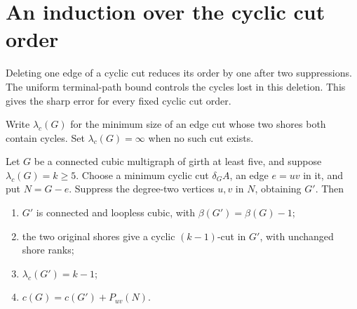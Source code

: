 \section{An induction over the cyclic cut order}
\label{sec:path-fixed-cut-induction}

Deleting one edge of a cyclic cut reduces its order by one after two suppressions.
The uniform terminal-path bound controls the cycles lost in this deletion.
This gives the sharp error for every fixed cyclic cut order.

Write $\lambda_c(G)$ for the minimum size of an edge cut whose two shores both contain cycles.
Set $\lambda_c(G)=\infty$ when no such cut exists.

\begin{lemma}
\label{lem:path-minimum-cyclic-cut-smoothing}
Let $G$ be a connected cubic multigraph of girth at least five, and suppose $\lambda_c(G)=k\ge5$.
Choose a minimum cyclic cut $\delta_G A$, an edge $e=uv$ in it, and put $N=G-e$.
Suppress the degree-two vertices $u,v$ in $N$, obtaining $G'$.
Then
\begin{enumerate}
\item $G'$ is connected and loopless cubic, with $\beta(G')=\beta(G)-1$;
\item the two original shores give a cyclic $(k-1)$-cut in $G'$, with unchanged shore ranks;
\item $\lambda_c(G')=k-1$;
\item $c(G)=c(G')+P_{uv}(N)$.
\end{enumerate}
\end{lemma}

